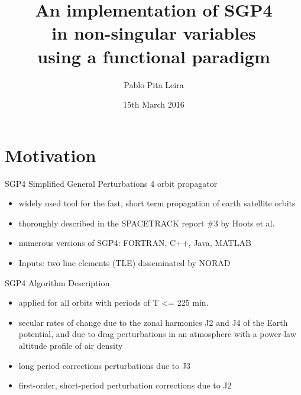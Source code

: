 \documentclass[10pt, compress, xcolor={usenames,dvipsnames}]{beamer}
\title{An implementation of SGP4  \\
in non-singular variables  \\
using a functional paradigm}
\author{Pablo Pita Leira}
\date{%
  \small 15th March 2016\\[2em]}
\newcommand{\SmallArrow}{\ding{228}}
\begin{document}
\begin{frame}
  \titlepage
\end{frame}


\section{Motivation}

\begin{frame}[fragile]{SGP4}
Simplified General Perturbations 4 orbit propagator

\begin{itemize}[label=\SmallArrow]
\item  widely used tool for the fast, short term propagation of earth satellite orbits
\item  thoroughly described in the SPACETRACK report \#3 by Hoots et al.
\item  numerous versions of SGP4: FORTRAN, C++, Java, MATLAB
\item  Inputs: two line elements (TLE) disseminated by NORAD
\end{itemize}


\end{frame}

\begin{frame}[fragile]{SGP4 Algorithm Description}

\begin{itemize}[label=\SmallArrow]
\item applied for all orbits with periods of T <= 225 min.
\item secular rates of change due to the zonal harmonics J2 and J4 of the Earth potential,
 and due to drag perturbations in an atmosphere with a power-law altitude profile of air density
\item long period corrections perturbations due to J3
\item first-order, short-period perturbation corrections due to J2
\end{itemize}


\end{frame}
\end{document}

